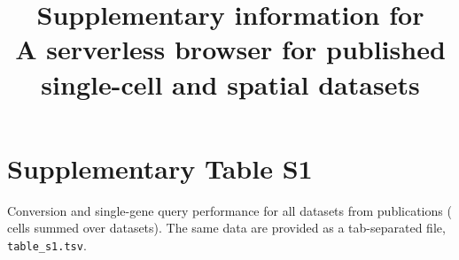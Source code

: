 \documentclass[10pt,a4paper]{article}
\title{\bfseries Supplementary information for\\
A serverless browser for published single-cell and spatial datasets}
\author{}
\date{}
\begin{document}
\maketitle
\vspace{-12mm}

\section*{Supplementary Table S1}

Conversion and single-gene query performance for all \NumDatasets{} datasets
from \NumPublications{} publications (\NumCells{} cells summed over datasets).
The same data are provided as a tab-separated file, \texttt{table\_s1.tsv}.


\end{document}
